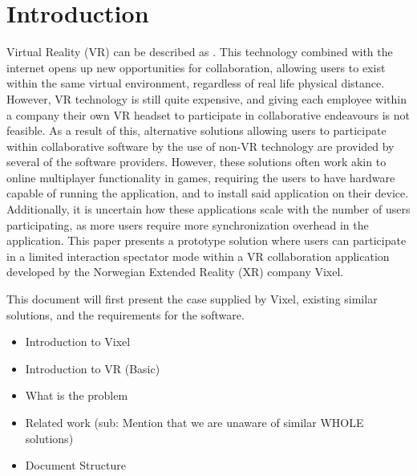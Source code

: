 \section{Introduction}
Virtual Reality (VR) can be described as \cite{vr_definition}. This technology combined with the internet opens up new opportunities for collaboration, allowing users to exist within the same virtual environment, regardless of real life physical distance.  However, VR technology is still quite expensive, and giving each employee within a company their own VR headset to participate in collaborative endeavours is not feasible. As a result of this, alternative solutions allowing users to participate within collaborative software by the use of non-VR technology are provided by several of the software providers. However, these solutions often work akin to online multiplayer functionality in games, requiring the users to have hardware capable of running the application, and to install said application on their device. Additionally, it is uncertain how these applications scale with the number of users participating, as more users require more synchronization overhead in the application. This paper presents a prototype solution where users can participate in a limited interaction spectator mode within a VR collaboration application developed by the Norwegian Extended Reality (XR) company Vixel.

This document will first present the case supplied by Vixel, existing similar solutions, and the requirements for the software. 


\begin{itemize}
    \item Introduction to Vixel
    \item Introduction to VR (Basic)
    \item What is the problem
    \item Related work (sub: Mention that we are unaware of similar WHOLE solutions)
    \item Document Structure
\end{itemize}